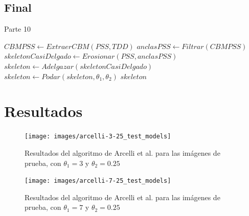 \subsection{Final}

\begin{algorithm}[H]
\caption{Parte 10}
\begin{algorithmic}[1]
    \State $CBMPSS \gets ExtraerCBM(PSS, TDD)$
    \State $anclasPSS \gets Filtrar(CBMPSS)$
    \State $skeletonCasiDelgado \gets Erosionar(PSS, anclasPSS)$
    \State $skeleton \gets Adelgazar(skeletonCasiDelgado)$
    \State $skeleton \gets Podar(skeleton, \theta_1, \theta_2)$ \label{ddprune2}
    \State \Return $skeleton$
\EndFunction
\end{algorithmic}
\end{algorithm}

\section{Resultados}

\begin{figure}[ht]
\texttt{[image: images/arcelli-3-25\_test\_models]}
\caption{Resultados del algoritmo de Arcelli et al. para las imágenes de prueba, con $\theta_1 = 3$ y $\theta_2 = 0.25$}
\label{fig:arcelli-3-25_test_models}
\end{figure}

\begin{figure}[ht]\centering
\texttt{[image: images/arcelli-7-25\_test\_models]}
\caption{Resultados del algoritmo de Arcelli et al. para las imágenes de prueba, con $\theta_1 = 7$ y $\theta_2 = 0.25$}
\label{fig:arcelli-7-25_test_models}
\end{figure}
